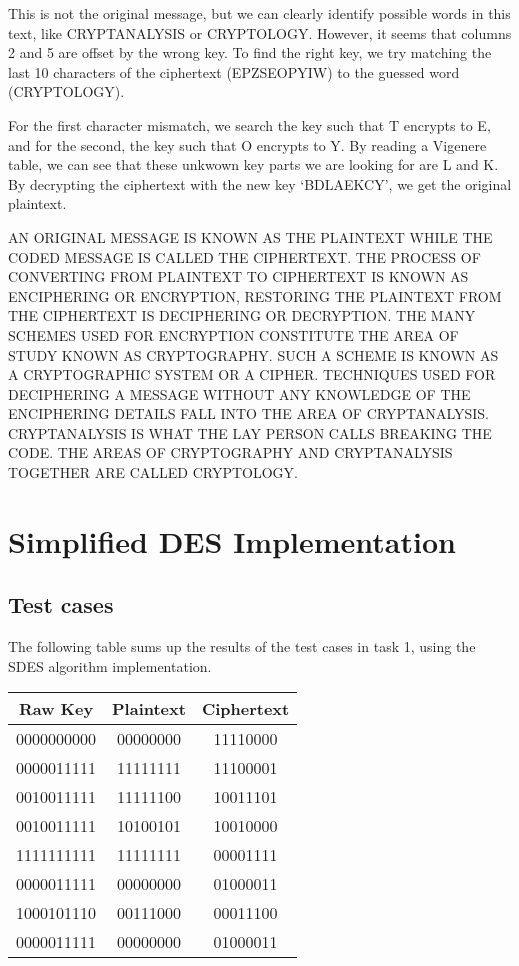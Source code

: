 \documentclass{article}
\begin{document}
This is not the original message, but we can clearly identify possible words in this text, like CRYPTANALYSIS or CRYPTOLOGY. However, it seems that columns 2 and 5 are offset by the wrong key. To find the right key, we try matching the last 10 characters of the ciphertext (EPZSEOPYIW) to the guessed word (CRYPTOLOGY). 

For the first character mismatch, we search the key such that T encrypts to E, and for the second, the key such that O encrypts to Y. By reading a Vigenere table, we can see that these unkwown key parts we are looking for are L and K.
By decrypting the ciphertext with the new key `BDLAEKCY', we get the original plaintext.
\bigskip

\sloppy
AN ORIGINAL MESSAGE IS KNOWN AS THE PLAINTEXT WHILE THE CODED MESSAGE IS CALLED THE CIPHERTEXT. THE PROCESS OF CONVERTING FROM PLAINTEXT TO CIPHERTEXT IS KNOWN AS ENCIPHERING OR ENCRYPTION,  RESTORING THE PLAINTEXT FROM THE CIPHERTEXT IS DECIPHERING OR DECRYPTION. THE MANY SCHEMES USED FOR ENCRYPTION CONSTITUTE THE AREA OF STUDY KNOWN AS CRYPTOGRAPHY. SUCH A SCHEME IS KNOWN AS A CRYPTOGRAPHIC SYSTEM OR A CIPHER. TECHNIQUES USED FOR DECIPHERING A MESSAGE WITHOUT ANY KNOWLEDGE OF THE ENCIPHERING DETAILS FALL INTO THE AREA OF CRYPTANALYSIS. CRYPTANALYSIS IS WHAT THE LAY PERSON CALLS BREAKING THE CODE. THE AREAS OF CRYPTOGRAPHY AND CRYPTANALYSIS TOGETHER ARE CALLED CRYPTOLOGY.

\section{Simplified DES Implementation}

\subsection{Test cases}


The following table sums up the results of the test cases in task 1, using the SDES algorithm implementation.

\begin{center}
    \begin{tabular}{|c c c|}
        \hline
        \textbf{Raw Key} & \textbf{Plaintext} & \textbf{Ciphertext} \\
        \hline
        0000000000 & 00000000 & 11110000 \\
        0000011111 & 11111111 & 11100001 \\
        0010011111 & 11111100 & 10011101 \\
        0010011111 & 10100101 & 10010000 \\
        1111111111 & 11111111 & 00001111 \\
        0000011111 & 00000000 & 01000011 \\
        1000101110 & 00111000 & 00011100 \\
        0000011111 & 00000000 & 01000011 \\
        \hline
    \end{tabular}
\end{center}
\end{document}
